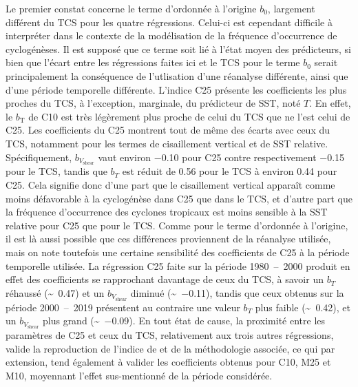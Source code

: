 \documentclass[../main.tex]{subfiles}
\begin{document}
Le premier constat concerne le terme d'ordonnée à l'origine $b_0$, largement différent du TCS pour les quatre régressions. Celui-ci est cependant difficile à
interpréter dans le contexte de la modélisation de la fréquence d'occurrence de cyclogénèses. Il est supposé que ce terme soit lié à l'état moyen des
prédicteurs, si bien que l'écart entre les régressions faites ici et le TCS pour le terme $b_0$ serait principalement la conséquence de l'utlisation d'une
réanalyse différente, ainsi que d'une période temporelle différente. L'indice C25 présente les coefficients les plus proches du TCS, à l'exception, marginale,
du prédicteur de SST, noté $T$. En effet, le $b_{\mathrm{T}}$ de C10 est très légèrement plus proche de celui du TCS que ne l'est celui de C25. Les coefficients
du C25 montrent tout de même des écarts avec ceux du TCS, notamment pour les termes de cisaillement vertical et de SST relative. Spécifiquement,
$b_{V_{\mathrm{shear}}}$ vaut environ \num{-0.10} pour C25 contre respectivement \num{-0.15} pour le TCS, tandis que $b_T$ est réduit de \num{0.56} pour le TCS
à environ \num{0.44} pour C25. Cela signifie donc d'une part que le cisaillement vertical apparaît comme moins défavorable à la cyclogénèse dans C25 que dans le
TCS, et d'autre part que la fréquence d'occurrence des cyclones tropicaux est moins sensible à la SST relative pour C25 que pour le TCS. Comme pour le terme
d'ordonnée à l'origine, il est là aussi possible que ces différences proviennent de la réanalyse utilisée, mais on note toutefois une certaine sensibilité des
coefficients de C25 à la période temporelle utilisée. La régression C25 faite sur la période \num{1980}~--~\num{2000} produit en effet des coefficients se
rapprochant davantage de ceux du TCS, à savoir un $b_T$ réhaussé (\sim~\num{0.47}) et un $b_{V_{\mathrm{shear}}}$ diminué (\sim~\num{-0.11}), tandis que ceux
obtenus sur la période \num{2000}~--~\num{2019} présentent au contraire une valeur $b_T$ plus faible (\sim~\num{0.42}), et un $b_{V_{\mathrm{shear}}}$ plus
grand (\sim~\num{-0.09}). En tout état de cause, la proximité entre les paramètres de C25 et ceux du TCS, relativement aux trois autres régressions, valide la
reproduction de l'indice de \textcite{tippett_poisson_2011} et de la méthodologie associée, ce qui par extension, tend également à valider les coefficients
obtenus pour C10, M25 et M10, moyennant l'effet sus-mentionné de la période considérée.
\end{document}
